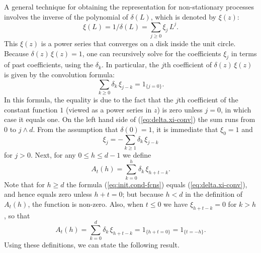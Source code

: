 \documentclass[a4paper]{book}
\begin{document}
A general technique for obtaining the representation for non-stationary 
processes involves the     inverse of the polynomial of $\delta(L)$, which is
 denoted by $\xi (z)$:
\begin{equation}
\label{eq:xi-def}
 \xi (L) = 1/ \delta (L) = \sum_{j \geq 0 }  \xi_j \, L^j.
\end{equation}
 This $\xi (z)$ is a power series that converges on a disk inside the unit circle.
  Because $\delta (z) \, \xi (z) = 1$, one can recursively solve for the
   coefficients $\xi_j$ in terms of past coefficients, using the $\delta_k$.
  In particular, the $j$th coefficient of $\delta (z) \, \xi (z)$ is given by
  the convolution formula:
\begin{equation}
\label{eq:delta.xi-conv}
  \sum_{k \geq 0} \delta_k \, \xi_{j-k} = 1_{ \{ j=0 \} }.
\end{equation}
  In this formula, the equality is due to the fact that the $j$th coefficient of
   the constant function $1$ (viewed as a power series in $z$) is zero unless $j=0$,
   in which case it equals one.  On the left hand side of (\ref{eq:delta.xi-conv})
   the sum runs from $0$ to  $j \wedge d$.  From the assumption that $\delta (0) =1$,
 it is immediate that $\xi_0 = 1$ and 
  \[
  \xi_j = - \sum_{k \geq 1} \delta_k \, \xi_{j-k}
  \]
for $j > 0$.  Next, for any $ 0 \leq h \leq d-1$ we define
\begin{equation}
\label{eq:init.cond-fcns}
  A_{t} (h) = \sum_{k=0}^h \delta_k \, \xi_{h+t-k}.
\end{equation}
 Note that for $h \geq d$ the formula (\ref{eq:init.cond-fcns}) equals 
 (\ref{eq:delta.xi-conv}), and hence equals zero unless $h+t = 0$; but because
$h < d$ in the definition of $A_t (h)$, the function is non-zero.
  Also, when $ t \leq 0$ we have $\xi_{h+t-k} = 0$ for $ k > h$, so that
\[
 A_t (h) = \sum_{k=0}^d \delta_k \, \xi_{h+t-k} = 1_{ \{ h+t = 0 \} } = 1_{ \{ t = -h \}}.
\]
 Using these definitions, we can state the following result.
 
\end{document}
